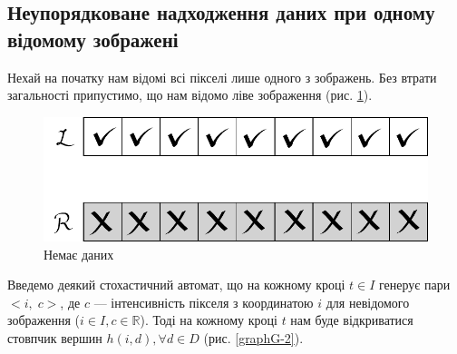 \subsection{Неупорядковане надходження даних при одному відомому зображені}
Нехай на початку нам відомі всі пікселі лише одного з зображень. Без втрати загальності припустимо, що нам відомо ліве зображення (рис. \ref{1.3nodata}).
\begin{figure}[h!]
	\centering
	\includegraphics[scale = 0.8]{allclosed.pdf}
	\caption{Немає даних}
	\label{1.3nodata}
\end{figure}
Введемо деякий стохастичний автомат, що на кожному кроці $ t \in I $ генерує пари $<i, \;c>$, де $ c $ --- інтенсивність пікселя з координатою $ i $ для невідомого зображення ($ i \in I, c \in \mathbb{R} $). 
Тоді на кожному кроці $ t $ нам буде відкриватися стовпчик вершин $  h(i, d), \forall d \in D $ (рис. \ref{graphG-2}).
